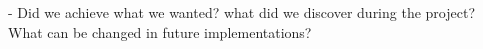 - Did we achieve what we wanted? what did we discover during the project? What can be changed in future implementations?